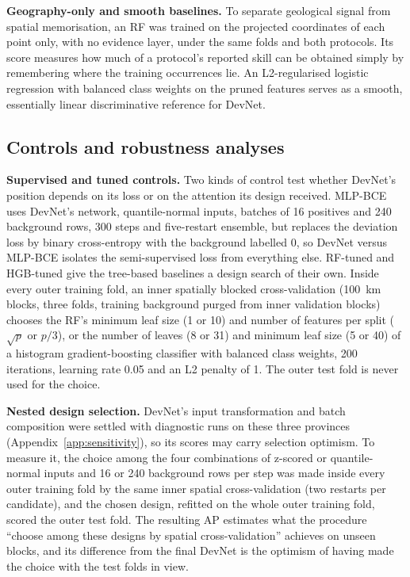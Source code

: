 \documentclass[pdflatex,sn-apa]{sn-jnl}
\begin{document}
\textbf{Geography-only and smooth baselines.} To separate geological signal from spatial memorisation, an RF was trained on the projected coordinates of each point only, with no evidence layer, under the same folds and both protocols. Its score measures how much of a protocol's reported skill can be obtained simply by remembering where the training occurrences lie. An L2-regularised logistic regression with balanced class weights on the pruned features serves as a smooth, essentially linear discriminative reference for DevNet.

\subsection{Controls and robustness analyses}\label{sec:robust-methods}

\textbf{Supervised and tuned controls.} Two kinds of control test whether DevNet's position depends on its loss or on the attention its design received. MLP-BCE uses DevNet's network, quantile-normal inputs, batches of 16 positives and 240 background rows, 300 steps and five-restart ensemble, but replaces the deviation loss by binary cross-entropy with the background labelled 0, so DevNet versus MLP-BCE isolates the semi-supervised loss from everything else. RF-tuned and HGB-tuned give the tree-based baselines a design search of their own. Inside every outer training fold, an inner spatially blocked cross-validation (100~km blocks, three folds, training background purged from inner validation blocks) chooses the RF's minimum leaf size (1 or 10) and number of features per split ($\sqrt{p}$ or $p/3$), or the number of leaves (8 or 31) and minimum leaf size (5 or 40) of a histogram gradient-boosting classifier \citep{Pedregosa2011} with balanced class weights, 200 iterations, learning rate 0.05 and an L2 penalty of 1. The outer test fold is never used for the choice.

\textbf{Nested design selection.} DevNet's input transformation and batch composition were settled with diagnostic runs on these three provinces (Appendix~\ref{app:sensitivity}), so its scores may carry selection optimism. To measure it, the choice among the four combinations of z-scored or quantile-normal inputs and 16 or 240 background rows per step was made inside every outer training fold by the same inner spatial cross-validation (two restarts per candidate), and the chosen design, refitted on the whole outer training fold, scored the outer test fold. The resulting AP estimates what the procedure ``choose among these designs by spatial cross-validation'' achieves on unseen blocks, and its difference from the final DevNet is the optimism of having made the choice with the test folds in view.
\end{document}
